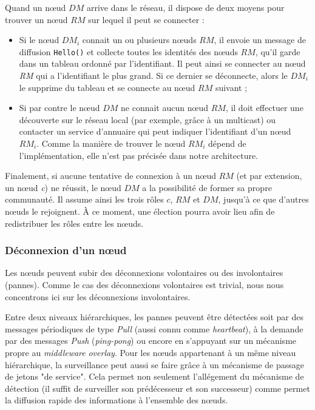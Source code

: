 Quand un n{\oe}ud $DM$ arrive dans le réseau, il dispose de deux moyens pour trouver un n{\oe}ud $RM$ sur lequel il peut se connecter :
\begin{itemize}
	\item Si le n{\oe}ud $DM_i$ connait un ou plusieurs n{\oe}uds $RM$, il envoie un message de diffusion \texttt{Hello()} et collecte toutes les identités des n{\oe}uds $RM$, qu'il garde dans un tableau ordonné par l'identifiant. Il peut ainsi se connecter au n{\oe}ud \textit{RM} qui a l'identifiant le plus grand. Si ce dernier se déconnecte, alors le $DM_i$ le supprime du tableau et se connecte au n{\oe}ud $RM$ suivant ; 
	\item Si par contre le n{\oe}ud $DM$ ne connait aucun n{\oe}ud $RM$, il doit effectuer une découverte sur le réseau local (par exemple, grâce à un multicast) ou contacter un service d'annuaire qui peut indiquer l'identifiant d'un n{\oe}ud $RM_i$. Comme la manière de trouver le n{\oe}ud $RM_i$ dépend de l'implémentation, elle n'est pas précisée dans notre architecture.
\end{itemize}
Finalement, si aucune tentative de connexion à un n{\oe}ud $RM$ (et par extension, un n{\oe}ud \textit{c}) ne réussit, le n{\oe}ud $DM$ a la possibilité de former sa propre communauté. Il assume ainsi les trois rôles $c$, $RM$ et $DM$, jusqu'à ce que d'autres n{\oe}uds le rejoignent. À ce moment, une élection pourra avoir lieu afin de redistribuer les rôles entre les n{\oe}uds.

\subsubsection*{Déconnexion d'un n{\oe}ud} 

Les n{\oe}uds peuvent subir des déconnexions volontaires ou des involontaires (pannes). Comme le cas des déconnexions volontaires est trivial, nous nous concentrons ici sur les déconnexions involontaires.

Entre deux niveaux hiérarchiques, les pannes peuvent être détectées soit par des messages périodiques de type \textit{Pull} (aussi connu comme \textit{heartbeat}), à la demande par des messages \textit{Push} (\textit{ping-pong}) \cite{Chandra96} ou encore en s'appuyant sur un mécanisme propre au \textit{middleware} \textit{overlay}. Pour les n{\oe}uds appartenant à un même niveau hiérarchique, la surveillance peut aussi se faire grâce à un mécanisme de passage de jetons "de service". Cela permet non seulement l'allégement du mécanisme de détection (il suffit de surveiller son prédécesseur et son successeur) comme permet la diffusion rapide des informations à l'ensemble des n{\oe}uds.

